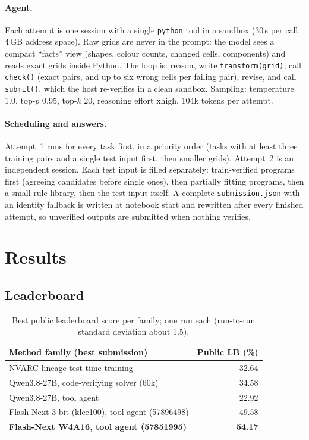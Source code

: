 \documentclass[11pt]{article}
\begin{document}
\paragraph{Agent.} Each attempt is one session with a single \texttt{python} tool in a sandbox (30\,s per call, 4\,GB address space). Raw grids are never in the prompt: the model sees a compact ``facts'' view (shapes, colour counts, changed cells, components) and reads exact grids inside Python. The loop is: reason, write \texttt{transform(grid)}, call \texttt{check()} (exact pairs, and up to six wrong cells per failing pair), revise, and call \texttt{submit()}, which the host re-verifies in a clean sandbox. Sampling: temperature 1.0, top-$p$ 0.95, top-$k$ 20, reasoning effort xhigh, 104k tokens per attempt.

\paragraph{Scheduling and answers.} Attempt~1 runs for every task first, in a priority order (tasks with at least three training pairs and a single test input first, then smaller grids). Attempt~2 is an independent session. Each test input is filled separately: train-verified programs first (agreeing candidates before single ones), then partially fitting programs, then a small rule library, then the test input itself. A complete \texttt{submission.json} with an identity fallback is written at notebook start and rewritten after every finished attempt, so unverified outputs are submitted when nothing verifies.

\section{Results}
\subsection{Leaderboard}
\begin{table}[t]
\centering\small
\begin{tabular}{@{}lr@{}}
\toprule
Method family (best submission) & Public LB (\%) \\
\midrule
NVARC-lineage test-time training & 32.64 \\
Qwen3.8-27B, code-verifying solver (60k) & 34.58 \\
Qwen3.8-27B, tool agent & 22.92 \\
Flash-Next 3-bit (klee100), tool agent (57896498) & 49.58 \\
\textbf{Flash-Next W4A16, tool agent (57851995)} & \textbf{54.17} \\
\bottomrule
\end{tabular}
\caption{Best public leaderboard score per family; one run each (run-to-run standard deviation about 1.5).}
\label{tab:lb}
\end{table}
\end{document}
